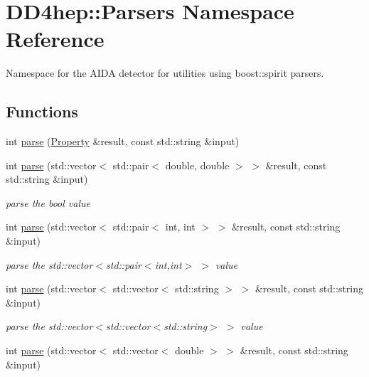 \hypertarget{namespace_d_d4hep_1_1_parsers}{}\section{D\+D4hep\+:\+:Parsers Namespace Reference}
\label{namespace_d_d4hep_1_1_parsers}


Namespace for the A\+I\+DA detector for utilities using boost\+::spirit parsers.  


\subsection*{Functions}
\begin{DoxyCompactItemize}
\item 
int \hyperlink{namespace_d_d4hep_1_1_parsers_a49cf20eb52b8e48550d6e3f74b94069e}{parse} (\hyperlink{class_d_d4hep_1_1_property}{Property} \&result, const std\+::string \&input)
\item 
int \hyperlink{namespace_d_d4hep_1_1_parsers_ad0d0bfb1ee52c6c6fe6000325562b1fa}{parse} (std\+::vector$<$ std\+::pair$<$ double, double $>$ $>$ \&result, const std\+::string \&input)
\begin{DoxyCompactList}\small\item\em parse the {\ttfamily bool} value \end{DoxyCompactList}\item 
int \hyperlink{namespace_d_d4hep_1_1_parsers_a300ef2062786116541bef473b809ee22}{parse} (std\+::vector$<$ std\+::pair$<$ int, int $>$ $>$ \&result, const std\+::string \&input)
\begin{DoxyCompactList}\small\item\em parse the {\ttfamily std\+::vector$<$std\+::pair$<$int,int$>$ $>$} value \end{DoxyCompactList}\item 
int \hyperlink{namespace_d_d4hep_1_1_parsers_afd6bbff0d1fc52ec885e45126f670506}{parse} (std\+::vector$<$ std\+::vector$<$ std\+::string $>$ $>$ \&result, const std\+::string \&input)
\begin{DoxyCompactList}\small\item\em parse the {\ttfamily std\+::vector$<$std\+::vector$<$std\+::string$>$ $>$} value \end{DoxyCompactList}\item 
int \hyperlink{namespace_d_d4hep_1_1_parsers_aaec3e97d2c62b4ca583b113b7c55e44c}{parse} (std\+::vector$<$ std\+::vector$<$ double $>$ $>$ \&result, const std\+::string \&input)

\end{DoxyCompactItemize}
